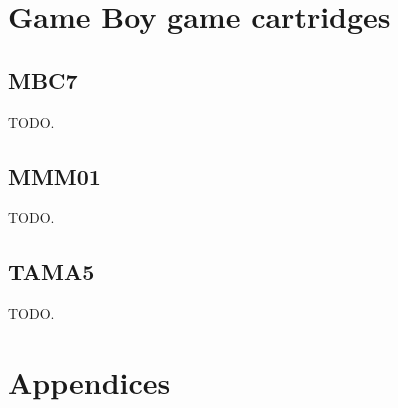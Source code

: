 \documentclass[a4paper, draft, oneside]{memoir}
\begin{document}
\part{Game Boy game cartridges}








\chapter{MBC7}

TODO.




\chapter{MMM01}

TODO.

\chapter{TAMA5}

TODO.

\part*{Appendices}

\begin{appendices}




\end{appendices}


\end{document}
